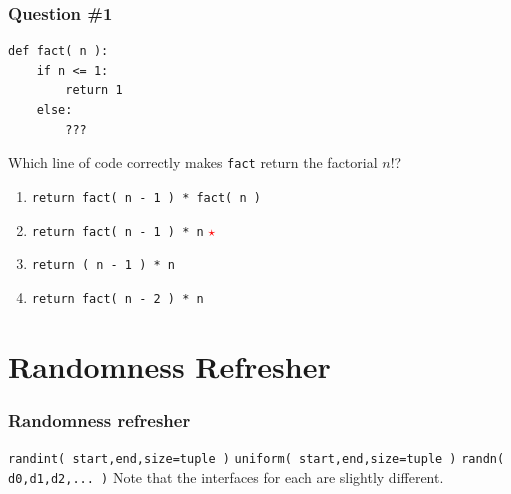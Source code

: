 \documentclass[11pt]{beamer}
\newcommand{\correctstar}{\textcolor{red}{$\star$}}
\begin{document}
\begin{frame}[fragile]
  \frametitle{Question \#1}

  \begin{Verbatim}
def fact( n ):
    if n <= 1:
        return 1
    else:
        ???
  \end{Verbatim}

Which line of code correctly makes \texttt{fact} return the factorial $n!$?

  \begin{enumerate}[label=\Alph*]
    \item  \texttt{return fact( n - 1 ) * fact( n )}
    \item  \texttt{return fact( n - 1 ) * n}  \correctstar
    \item  \texttt{return ( n - 1 ) * n}
    \item  \texttt{return fact( n - 2 ) * n}
  \end{enumerate}
\end{frame}

\section{Randomness Refresher}

\begin{frame}[fragile]
  \frametitle{Randomness refresher}
  \Enlarge

  \begin{enumerate}
  \myitem  \texttt{randint( start,end,size=tuple )} %
  \myitem  \texttt{uniform( start,end,size=tuple )} %
  \myitem  \texttt{randn( d0,d1,d2,... )} %
  \mysubitem  Note that the interfaces for each are slightly different.
  \end{enumerate}
\end{frame}
\end{document}
